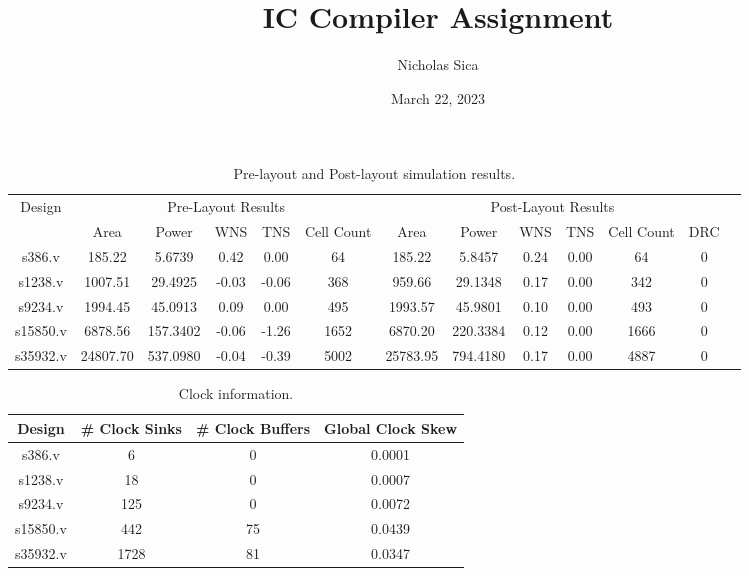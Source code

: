 \documentclass{article}
\title{IC Compiler Assignment}
\author{Nicholas Sica}
\date{March 22, 2023}
\begin{document}
\maketitle

\begin{table}
\centering
\caption{Pre-layout and Post-layout simulation results.}
\begin{tabular}{ |c|c|c|c|c|c|c|c|c|c|c|c|c| }
    \hline
    \multirow{2}{*}{Design} & \multicolumn{5}{|c|}{Pre-Layout Results} & \multicolumn{6}{|c|}{Post-Layout Results} \\
    \cline{2-12}
    & Area & Power & WNS & TNS & Cell Count & Area & Power & WNS & TNS & Cell Count & DRC \\
    \hline
    s386.v & 185.22 & 5.6739 & 0.42 & 0.00 & 64 & 185.22 & 5.8457 & 0.24 & 0.00 & 64 & 0 \\
    \hline
    s1238.v & 1007.51 & 29.4925 & -0.03 & -0.06 & 368 & 959.66 & 29.1348 & 0.17 & 0.00 & 342 & 0 \\
    \hline
    s9234.v & 1994.45 & 45.0913 & 0.09 & 0.00 & 495 & 1993.57 & 45.9801 & 0.10 & 0.00 & 493 & 0 \\
    \hline
    s15850.v & 6878.56 & 157.3402 & -0.06 & -1.26 & 1652 & 6870.20 & 220.3384 & 0.12 & 0.00 & 1666 & 0 \\
    \hline
    s35932.v & 24807.70 & 537.0980 & -0.04 & -0.39 & 5002 & 25783.95 & 794.4180 & 0.17 & 0.00 & 4887 & 0 \\
    \hline
\end{tabular}
\end{table}

\begin{table}
\centering
\caption{Clock information.}
\begin{tabular}{ |c|c|c|c| }
    \hline
    Design & \# Clock Sinks & \# Clock Buffers & Global Clock Skew \\
    \hline
    s386.v & 6 & 0 & 0.0001 \\
    s1238.v & 18 & 0 & 0.0007 \\
    s9234.v & 125 & 0 & 0.0072 \\
    s15850.v & 442 & 75 & 0.0439 \\
    s35932.v & 1728 & 81 & 0.0347 \\
\end{tabular}
\end{table}
\end{document}
